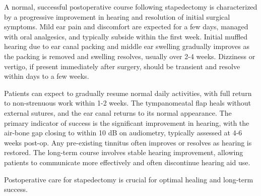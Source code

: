 A normal, successful postoperative course following stapedectomy is characterized by a progressive improvement in hearing and resolution of initial surgical symptoms. Mild ear pain and discomfort are expected for a few days, managed with oral analgesics, and typically subside within the first week. Initial muffled hearing due to ear canal packing and middle ear swelling gradually improves as the packing is removed and swelling resolves, usually over 2-4 weeks. Dizziness or vertigo, if present immediately after surgery, should be transient and resolve within days to a few weeks.

Patients can expect to gradually resume normal daily activities, with full return to non-strenuous work within 1-2 weeks. The tympanomeatal flap heals without external sutures, and the ear canal returns to its normal appearance. The primary indicator of success is the significant improvement in hearing, with the air-bone gap closing to within 10 dB on audiometry, typically assessed at 4-6 weeks post-op. Any pre-existing tinnitus often improves or resolves as hearing is restored. The long-term course involves stable hearing improvement, allowing patients to communicate more effectively and often discontinue hearing aid use.

Postoperative care for stapedectomy is crucial for optimal healing and long-term success.

